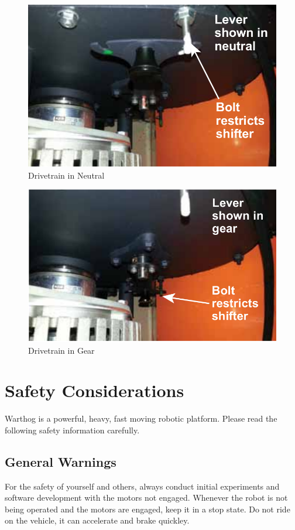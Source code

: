 \documentclass[]{clearpath-latex/clearpath-manual}
\begin{document}
\begin{figure}[!htb]
  \centering
  \includegraphics[width=0.75\linewidth]{drivetrain-neutral.png}
  \caption{Drivetrain in Neutral}
  \label{drivetrain-n}
\end{figure}


\begin{figure}[!t]
  \centering
  \includegraphics[width=0.75\linewidth]{drivetrain-gear.png}
  \caption{Drivetrain in Gear}
  \label{drivetrain-g}
\end{figure}


\section{Safety Considerations}

Warthog is a powerful, heavy, fast moving robotic platform. Please read the following safety information carefully.

\subsection{General Warnings}

For the safety of yourself and others, always conduct initial experiments and software development with the motors not engaged.  Whenever the robot is not being operated and the motors are engaged, keep it in a stop state.  Do not ride on the vehicle, it can accelerate and brake quickley.
\end{document}
